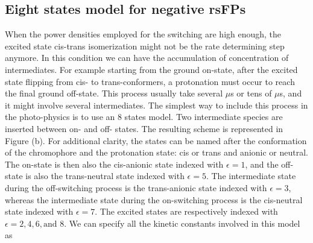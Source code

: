 \documentclass{article}
\begin{document}
\subsection{Eight states model for negative rsFPs}
When the power densities employed for the switching are high enough, the excited state cis-trans isomerization might not be the rate determining step anymore. In this condition we can have the accumulation of concentration of intermediates. For example starting from the ground on-state, after the excited state flipping from cis- to trans-conformers, a protonation must occur to reach the final ground off-state. This process usually take several $\mu$s or tens of $\mu$s, and it might involve several intermediates. The simplest way to include this process in the photo-physics is to use an 8 states model. Two intermediate species are inserted between on- and off- states. The resulting scheme is represented in Figure (b).
For additional clarity, the states can be named after the conformation of the chromophore and the protonation state: cis or trans and anionic or neutral. The on-state is then also the cis-anionic state indexed with $\epsilon=1$, and the off-state is also the trans-neutral state indexed with $\epsilon=5$. The intermediate state during the off-switching process is the trans-anionic state indexed with $\epsilon=3$, whereas the intermediate state during the on-switching process is the cis-neutral state indexed with $\epsilon=7$. The excited states are respectively indexed with $\epsilon=2,4,6,\text{and }8$.
We can specify all the kinetic constants involved in this model as
\end{document}
